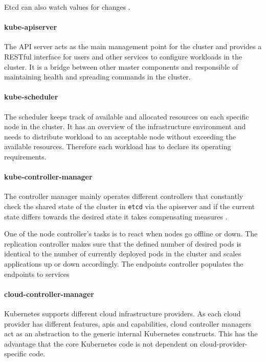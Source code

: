 Etcd can also watch values for changes \cite{baier-kub}.

\paragraph{kube-apiserver}\label{kube-apiserver}

The API server acts as the main management point for the cluster and
provides a RESTful interface for users and other services to configure
workloads in the cluster. It is a bridge between other master components
and responsible of maintaining health and spreading commands in the
cluster. \cite{kub_intro}

\paragraph{kube-scheduler}\label{kube-scheduler}

The scheduler keeps track of available and allocated resources on each
specific node in the cluster. It has an overview of the infrastructure
environment and needs to distribute workload to an acceptable node
without exceeding the available resources. Therefore each workload has
to declare its operating requirements. \cite{kub_intro}

\paragraph{kube-controller-manager}\label{kube-controller-manager}

The controller manager mainly operates different controllers that
constantly check the shared state of the cluster in \texttt{etcd} via
the apiserver \cite{kub_comp} and if the current state differs towards
the desired state it takes compensating measures \cite{kub_intro}.

One of the node controller's tasks is to react when nodes go offline or
down. The replication controller makes sure that the defined number of
desired pods is identical to the number of currently deployed pods in
the cluster and scales applications up or down accordingly. The
endpoints controller populates the endpoints to services \cite{kub_comp}

\paragraph{cloud-controller-manager}\label{cloud-controller-manager}

Kubernetes supports different cloud infrastructure providers. As each
cloud provider has different features, apis and capabilities, cloud
controller managers act as an abstraction to the generic internal
Kubernetes constructs. This has the advantage that the core Kubernetes
code is not dependent on cloud-provider-specific code. \cite{kub_comp}


